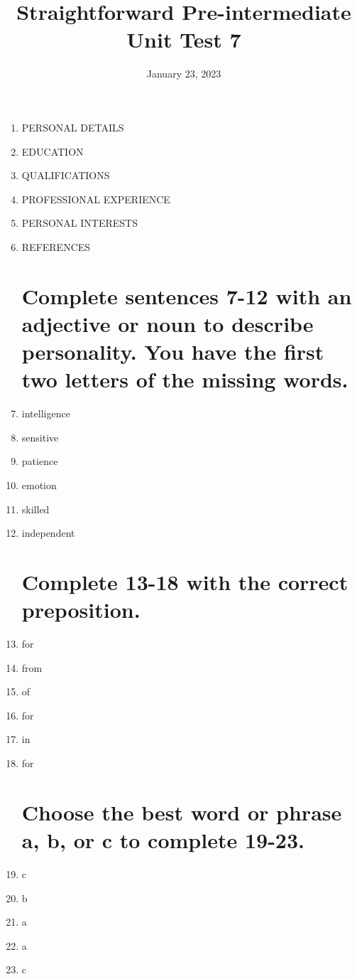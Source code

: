 \documentclass[a5paper, 10pt, final]{extreport}
\title{Straightforward Pre-intermediate Unit Test 7}
\date{January 23, 2023}
\begin{document}
\maketitle
\tableofcontents
\newpage

\begin{enumerate}
\section{Complete the CV (curriculum vitae) with the correct words or phrases.}
\item PERSONAL DETAILS
\item EDUCATION
\item QUALIFICATIONS
\item PROFESSIONAL EXPERIENCE
\item PERSONAL INTERESTS
\item REFERENCES

\section{Complete sentences 7-12 with an adjective or noun to describe personality. You have the first two letters of the missing words.}
\item intelligence
\item sensitive
\item patience
\item emotion
\item skilled
\item independent

\section{Complete 13-18 with the correct preposition.}
\item for
\item from
\item of
\item for
\item in
\item for

\section{Choose the best word or phrase a, b, or c to complete 19-23.}
\item c
\item b
\item a
\item a
\item c


\end{enumerate}
\end{document}
